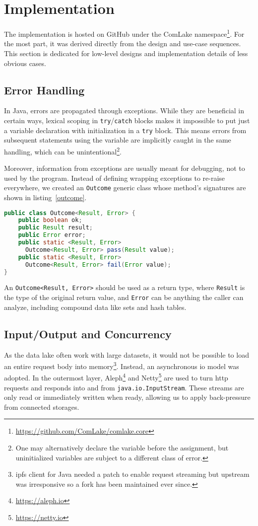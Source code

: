 \section{Implementation}
The implementation is hosted on GitHub under the ComLake
namespace\footnote{\url{https://github.com/ComLake/comlake.core}}.
For the most part, it was derived directly from the design
and use-case sequences.  This section is dedicated for low-level designs
and implementation details of less obvious cases.

\subsection{Error Handling}
In Java, errors are propagated through exceptions.  While they are beneficial
in certain ways, lexical scoping in \verb|try|/\verb|catch| blocks makes it
impossible to put just a variable declaration with initialization in
a \verb|try| block.  This means errors from subsequent statements using
the variable are implicitly caught in the same handling, which can
be unintentional\footnote{One may alternatively declare the variable before
the assignment, but uninitialized variables are subject to a different
class of error.}.

Moreover, information from exceptions are usually meant for debugging,
not to used by the program.  Instead of defining wrapping exceptions
to re-raise everywhere, we created an \verb|Outcome| generic class
whose method's signatures are shown in listing~\ref{outcome}.
\begin{lstlisting}[label=outcome,caption=Generic outcome type
  for replacing exceptions,language=java]
public class Outcome<Result, Error> {
    public boolean ok;
    public Result result;
    public Error error;
    public static <Result, Error>
      Outcome<Result, Error> pass(Result value);
    public static <Result, Error>
      Outcome<Result, Error> fail(Error value);
}
\end{lstlisting}

An \verb|Outcome<Result, Error>| should be used as a return type,
where \verb|Result| is the type of the original return value, and \verb|Error|
can be anything the caller can analyze, including compound data like sets
and hash tables.

\subsection{Input/Output and Concurrency}\label{future}
As the data lake often work with large datasets, it would not be possible
to load an entire request body into memory\footnote{\gls{ipfs} client for Java
needed a patch to enable request streaming but upstream was irresponsive so a
fork has been maintained ever since.}.  Instead, an asynchronous \gls{io} model
was adopted.  In the outermost layer, Aleph\footnote{\url{https://aleph.io}}
and Netty\footnote{\url{https://netty.io}} are used to turn \gls{http}
requests and responds into and from \verb|java.io.InputStream|.  These streams
are only read or immediately written when ready, allowing us to apply
back-pressure from connected storages.

